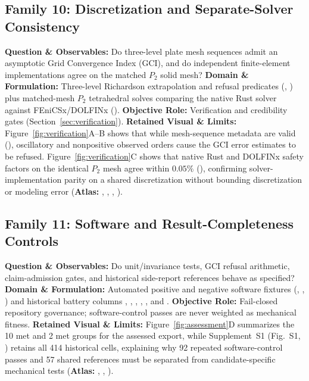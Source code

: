 \subsection{Family 10: Discretization and Separate-Solver Consistency}
\label{subsec:family-verification}
\textbf{Question \& Observables:} Do three-level plate mesh sequences admit an asymptotic Grid Convergence Index (GCI), and do independent finite-element implementations agree on the matched $P_2$ solid mesh?
\textbf{Domain \& Formulation:} Three-level Richardson extrapolation and refusal predicates (, ) plus matched-mesh $P_2$ tetrahedral solves comparing the native Rust solver against FEniCSx/DOLFINx ().
\textbf{Objective Role:} Verification and credibility gates (Section~\ref{sec:verification}).
\textbf{Retained Visual \& Limits:} Figure~\ref{fig:verification}A--B shows that while mesh-sequence metadata are valid (), oscillatory and nonpositive observed orders cause the GCI error estimates to be refused. Figure~\ref{fig:verification}C shows that native Rust and DOLFINx safety factors on the identical $P_2$ mesh agree within $0.05\%$ (), confirming solver-implementation parity on a shared discretization without bounding discretization or modeling error (\textbf{Atlas:} , , , ).

\subsection{Family 11: Software and Result-Completeness Controls}
\label{subsec:family-controls}
\textbf{Question \& Observables:} Do unit/invariance tests, GCI refusal arithmetic, claim-admission gates, and historical side-report references behave as specified?
\textbf{Domain \& Formulation:} Automated positive and negative software fixtures (, , ) and historical battery columns , , , , , and .
\textbf{Objective Role:} Fail-closed repository governance; software-control passes are never weighted as mechanical fitness.
\textbf{Retained Visual \& Limits:} Figure~\ref{fig:assessment}D summarizes the 10 met  and 2 met  groups for the assessed export, while Supplement~S1 (Fig.~S1, ) retains all 414 historical cells, explaining why 92 repeated software-control passes and 57 shared  references must be separated from candidate-specific mechanical tests (\textbf{Atlas:} , , ).

